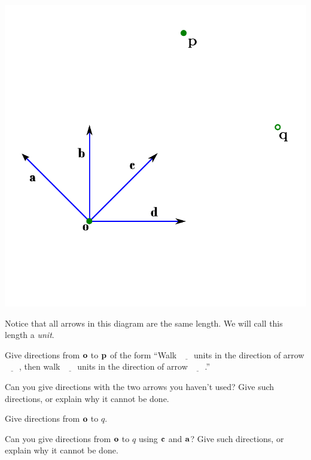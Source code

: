 \documentclass[letter]{article}
\newcommand{\ul}{$\underline{\phantom{xxx}}$}
\begin{document}
	\includegraphics{images/vectors-graphically.pdf}

	Notice that all arrows in this diagram are the same length.
	We will call this length a \emph{unit}.
	\begin{Enum}
		\item Give directions from $\bf o$ to $\bf p$ of
		the form ``Walk \ul units in the direction of arrow \ul, then 
		walk \ul units in the direction of arrow \ul.''

		\item Can you give directions with the two arrows you haven't
		used?  Give such directions, or explain why it cannot be done.

		\item Give directions from $\bf o$ to $q$.

		\item Can you give directions from $\bf o$ to $q$ using $\bf c$ and $\bf a$?
		Give such directions, or explain why it cannot be done.

	\end{Enum}
\end{document}
